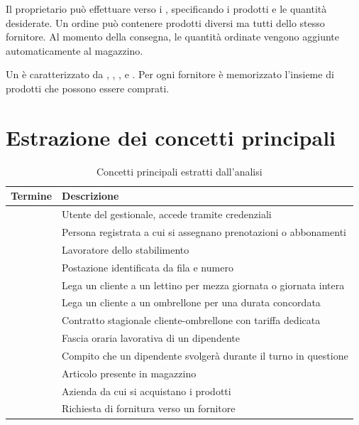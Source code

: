 \begin{tcolorbox}[breakable, colback=lightgray, colframe=primary!40, left=8pt, right=8pt,
                  top=6pt, bottom=6pt]
Il proprietario può effettuare  verso i ,
specificando i prodotti e le quantità desiderate. Un ordine può contenere prodotti
diversi ma tutti dello stesso fornitore. Al momento della consegna,
le quantità ordinate vengono aggiunte automaticamente al magazzino.

Un  è caratterizzato da , , , 
e . Per ogni fornitore è memorizzato l'insieme di prodotti che possono
essere comprati.

\end{tcolorbox}

\section{Estrazione dei concetti principali}

\begin{table}[H]
  \centering
  \caption{Concetti principali estratti dall'analisi}
  \label{tab:concetti}
  \begin{tabularx}{\textwidth}{L{3.65cm} L{11.5cm}}
    \toprule
    \textbf{Termine} & \textbf{Descrizione} \\
    \midrule
          & Utente del gestionale, accede tramite credenziali \\
               & Persona registrata a cui si assegnano prenotazioni o abbonamenti \\
            & Lavoratore dello stabilimento \\
            & Postazione identificata da fila e numero \\
              & Lega un cliente a un lettino per mezza giornata o giornata intera \\
          & Lega un cliente a un ombrellone per una durata concordata \\
           & Contratto stagionale cliente-ombrellone con tariffa dedicata \\
                 & Fascia oraria lavorativa di un dipendente \\
              & Compito che un dipendente svolgerà durante il turno in questione \\
              & Articolo presente in magazzino \\
             & Azienda da cui si acquistano i prodotti \\
                & Richiesta di fornitura verso un fornitore \\
    \bottomrule
  \end{tabularx}
\end{table}
